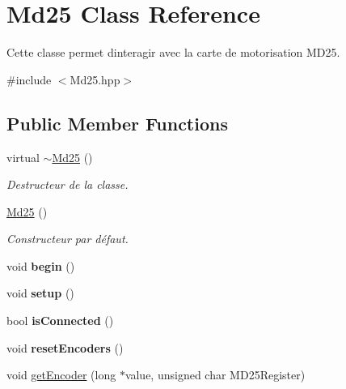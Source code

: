 \hypertarget{classMd25}{}\section{Md25 Class Reference}
\label{classMd25}


Cette classe permet d\textquotesingle{}interagir avec la carte de motorisation M\+D25.  




{\ttfamily \#include $<$Md25.\+hpp$>$}

\subsection*{Public Member Functions}
\begin{DoxyCompactItemize}
\item 
\mbox{\label{classMd25_a9191009668233af38c0545c3fa638b74}} 
virtual \hyperlink{classMd25_a9191009668233af38c0545c3fa638b74}{$\sim$\+Md25} ()
\begin{DoxyCompactList}\small\item\em Destructeur de la classe. \end{DoxyCompactList}\item 
\mbox{\label{classMd25_aafcc18c70fd3398bbb1717957269e155}} 
\hyperlink{classMd25_aafcc18c70fd3398bbb1717957269e155}{Md25} ()
\begin{DoxyCompactList}\small\item\em Constructeur par défaut. \end{DoxyCompactList}\item 
\mbox{\label{classMd25_a953794c697add1778ff8ae370c5ec958}} 
void {\bfseries begin} ()
\item 
\mbox{\label{classMd25_a3ffb27f7479370ec871892d4ecf18216}} 
void {\bfseries setup} ()
\item 
\mbox{\label{classMd25_a922ef7a8c805a8aab2454557111cb7a2}} 
bool {\bfseries is\+Connected} ()
\item 
\mbox{\label{classMd25_a695f4a5fe6ef9b19615119f2902ca50f}} 
void {\bfseries reset\+Encoders} ()
\item 
void \hyperlink{classMd25_a1bb2bac91e24a008856f5b3b7909fbf8}{get\+Encoder} (long $\ast$value, unsigned char M\+D25\+Register)

\end{DoxyCompactItemize}
